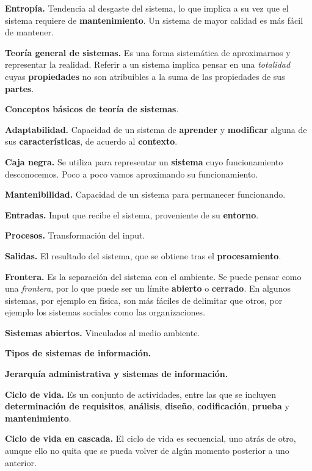 \documentclass{article}
\begin{document}
\textbf{Entropía.} Tendencia al desgaste del sistema, lo que implica a su vez 
que el sistema requiere de \textbf{mantenimiento}. Un sistema de mayor calidad 
es más fácil de mantener.

\textbf{Teoría general de sistemas.} Es una forma sistemática de aproximarnos y
representar la realidad. Referir a un sistema implica pensar en una 
\textit{totalidad} cuyas \textbf{propiedades }no son atribuibles a la suma de 
las propiedades de sus \textbf{partes}.

\textbf{Conceptos básicos de teoría de sistemas}. 

\textbf{Adaptabilidad.} Capacidad de un sistema de \textbf{aprender} y 
\textbf{modificar} alguna de sus \textbf{características}, de acuerdo al 
\textbf{contexto}.

\textbf{Caja negra.} Se utiliza para representar un \textbf{sistema} cuyo 
funcionamiento desconocemos. Poco a poco vamos aproximando su funcionamiento.

\textbf{Mantenibilidad.} Capacidad de un sistema para permanecer funcionando.

\textbf{Entradas.} Input que recibe el sistema, proveniente de su 
\textbf{entorno}.

\textbf{Procesos.} Transformación del input.

\textbf{Salidas.} El resultado del sistema, que se obtiene tras el 
\textbf{procesamiento}.

\textbf{Frontera.} Es la separación del sistema con el ambiente. Se puede pensar 
como una \textit{frontera}, por lo que puede ser un límite \textbf{abierto} o 
\textbf{cerrado}. En algunos sistemas, por ejemplo en física, son más fáciles de
delimitar que otros, por ejemplo los sistemas sociales como las organizaciones.

\textbf{Sistemas abiertos.} Vinculados al medio ambiente.

\textbf{Tipos de sistemas de información.}

\textbf{Jerarquía administrativa y sistemas de información.} 

\textbf{Ciclo de vida.} Es un conjunto de actividades, entre las que se incluyen
\textbf{determinación de requisitos}, \textbf{análisis}, \textbf{diseño},
\textbf{codificación}, \textbf{prueba} y \textbf{mantenimiento}. 

\textbf{Ciclo de vida en cascada.} El ciclo de vida es secuencial, uno atrás de
otro, aunque ello no quita que se pueda volver de algún momento posterior a uno
anterior.
\end{document}
